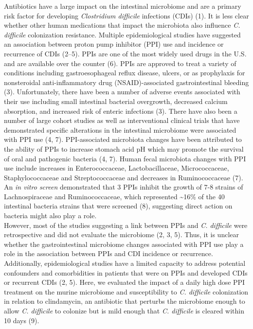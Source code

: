 \documentclass[11pt,]{article}
\begin{document}
Antibiotics have a large impact on the intestinal microbiome and are a
primary risk factor for developing \emph{Clostridium difficile}
infections (CDIs) (1). It is less clear whether other human medications
that impact the microbiota also influence \emph{C. difficile}
colonization resistance. Multiple epidemiological studies have suggested
an association between proton pump inhibitor (PPI) use and incidence or
recurrence of CDIs (2--5). PPIs are one of the most widely used drugs in
the U.S. and are available over the counter (6). PPIs are approved to
treat a variety of conditions including gastroesophageal reflux disease,
ulcers, or as prophylaxis for nonsteroidal anti-inflammatory drug
(NSAID)-associated gastrointestinal bleeding (3). Unfortunately, there
have been a number of adverse events associated with their use including
small intestinal bacterial overgrowth, decreased calcium absorption, and
increased risk of enteric infections (3). There have also been a number
of large cohort studies as well as interventional clinical trials that
have demonstrated specific alterations in the intestinal microbiome were
associated with PPI use (4, 7). PPI-associated microbiota changes have
been attributed to the ability of PPIs to increase stomach acid pH which
may promote the survival of oral and pathogenic bacteria (4, 7). Human
fecal microbiota changes with PPI use include increases in
Enterococcaceae, Lactobacillaceae, Micrococcaceae, Staphylococcaceae and
Streptococcaceae and decreases in Ruminococcaceae (7). An \emph{in vitro
screen} demonstrated that 3 PPIs inhibit the growth of 7-8 strains of
Lachnospiraceae and Ruminococcaceae, which represented
\textasciitilde{}16\% of the 40 intestinal bacteria strains that were
screened (8), suggesting direct action on bacteria might also play a
role.\\
However, most of the studies suggesting a link between PPIs and \emph{C.
difficile} were retrospective and did not evaluate the microbiome (2, 3,
5). Thus, it is unclear whether the gastrointestinal microbiome changes
associated with PPI use play a role in the association between PPIs and
CDI incidence or recurrence. Additionally, epidemiological studies have
a limited capacity to address potential confounders and comorbidities in
patients that were on PPIs and developed CDIs or recurrent CDIs (2, 5).
Here, we evaluated the impact of a daily high dose PPI treatment on the
murine microbiome and susceptibility to \emph{C. difficile} colonization
in relation to clindamycin, an antibiotic that perturbs the microbiome
enough to allow \emph{C. difficile} to colonize but is mild enough that
\emph{C. difficile} is cleared within 10 days (9).
\end{document}
